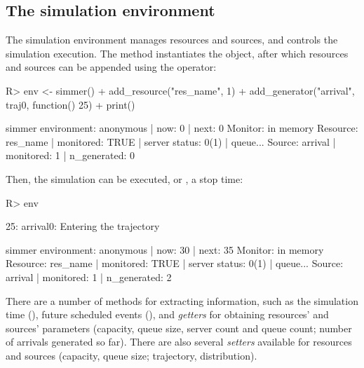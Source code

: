 \documentclass[
  nojss]{jss}
\begin{document}
\subsection{The simulation
environment}\label{the-simulation-environment}

The simulation environment manages resources and sources, and controls
the simulation execution. The  method instantiates the
object, after which resources and sources can be appended using the
\code{\%>\%} operator:

\begin{CodeChunk}
\begin{CodeInput}
R> env <- simmer() %
+   add_resource("res_name", 1) %
+   add_generator("arrival", traj0, function() 25) %
+   print()
\end{CodeInput}
\begin{CodeOutput}
simmer environment: anonymous | now: 0 | next: 0
{ Monitor: in memory }
{ Resource: res_name | monitored: TRUE | server status: 0(1) | queue... }
{ Source: arrival | monitored: 1 | n_generated: 0 }
\end{CodeOutput}
\end{CodeChunk}

Then, the simulation can be executed, or ,  a
stop time:

\begin{CodeChunk}
\begin{CodeInput}
R> env %
\end{CodeInput}
\begin{CodeOutput}
25: arrival0: Entering the trajectory
\end{CodeOutput}
\begin{CodeOutput}
simmer environment: anonymous | now: 30 | next: 35
{ Monitor: in memory }
{ Resource: res_name | monitored: TRUE | server status: 0(1) | queue... }
{ Source: arrival | monitored: 1 | n_generated: 2 }
\end{CodeOutput}
\end{CodeChunk}

There are a number of methods for extracting information, such as the
simulation time (), future scheduled events (),
and \emph{getters} for obtaining resources' and sources' parameters
(capacity, queue size, server count and queue count; number of arrivals
generated so far). There are also several \emph{setters} available for
resources and sources (capacity, queue size; trajectory, distribution).
\end{document}
